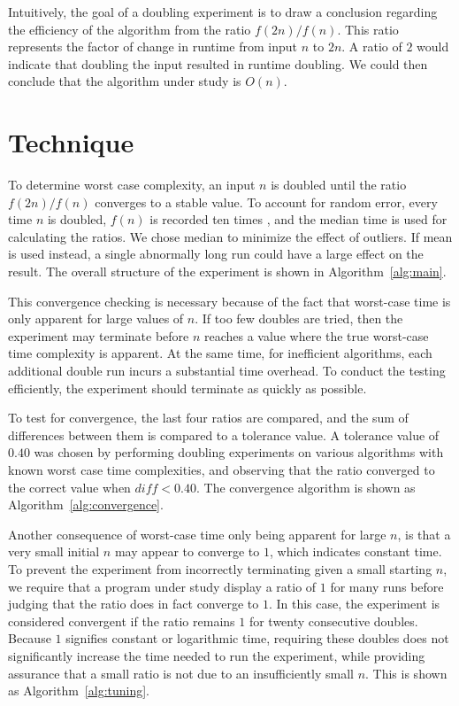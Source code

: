 \documentclass[smallextended]{svjour3}       %
\begin{document}
Intuitively, the goal of a doubling experiment is to draw a conclusion
regarding the efficiency of the algorithm from the ratio
$f(2n)/f(n)$. This ratio represents the factor of change in runtime from
input $n$ to $2n$. A ratio of $2$ would indicate that doubling the
input resulted in runtime doubling. We could then conclude that the
algorithm under study is $O(n)$. 

\section{Technique}
To determine worst case complexity, an input $n$ is doubled until the 
ratio $f(2n) / f(n)$ converges to a stable value. To account for random
error, every time $n$ is doubled, $f(n)$ is recorded ten times
, and the median time is used for calculating the ratios.  We chose
median to minimize the effect of outliers. If mean is used instead, a
single abnormally long run could have a large effect on the result. The overall 
structure of the experiment is shown in Algorithm~\ref{alg:main}.

This convergence checking is necessary because of the fact that worst-case
time is only apparent for large values of $n$. If too few doubles
are tried, then the experiment may terminate before $n$ reaches a value
where the true worst-case time complexity is apparent. At the same time,
for inefficient  algorithms, each additional double run incurs a substantial
time overhead. To conduct the testing efficiently, the experiment should
terminate as quickly as possible.

To test for convergence, the last four ratios are compared, and the
sum of differences between them is compared to a tolerance value. A
tolerance value of $0.40$ was chosen  by performing doubling
experiments on various algorithms with known worst case time
complexities, and observing that the ratio converged to the correct
value when $\mathit{diff} < 0.40$. The convergence algorithm is shown
as Algorithm~\ref{alg:convergence}.
  
Another consequence of worst-case time only being apparent for large
$n$, is that a very small initial $n$ may appear to converge to $1$,
which indicates constant time. To prevent the
experiment from incorrectly terminating given a small starting $n$, we
require that a program under study display a ratio of $1$ for many
runs before judging that the ratio does in fact converge to $1$. In this case,
the experiment is considered convergent if the ratio remains $1$ for 
twenty consecutive doubles.  Because $1$ signifies constant or logarithmic 
time, requiring these doubles does not significantly increase the time needed
to run the experiment, while providing assurance that a small ratio is not due
to an insufficiently small $n$. This  is shown as 
Algorithm~\ref{alg:tuning}.
\end{document}

